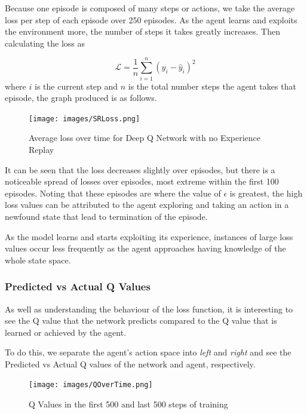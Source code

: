 \documentclass{article}
\begin{document}
Because one episode is composed of many steps or actions, we take the average loss per step of each episode over 250 episodes. As the agent learns and exploits the environment more, the number of steps it takes greatly increases. Then calculating the loss as 

\begin{equation}
    \mathcal{L} = \frac{1}{n} \sum_{i=1}^{n} (y_i - \hat{y}_i)^2
\end{equation}
where $i$ is the current step and $n$ is the total number steps the agent takes that episode, the graph produced is as follows.

\begin{figure}[H]
    \centering
    \texttt{[image: images/SRLoss.png]}
    \caption{Average loss over time for Deep Q Network with no Experience Replay}
    \label{fig:loss_sr}
\end{figure}

It can be seen that the loss decreases slightly over episodes, but there is a noticeable spread of losses over episodes, most extreme within the first 100 episodes. Noting that these episodes are where the value of $\epsilon$ is greatest, the high loss values can be attributed to the agent exploring and taking an action in a newfound state that lead to termination of the episode. 

As the model learns and starts exploiting its experience, instances of large loss values occur less frequently as the agent approaches having knowledge of the whole state space.

\subsubsection{Predicted vs Actual Q Values}

As well as understanding the behaviour of the loss function, it is interesting to see the Q value that the network predicts compared to the Q value that is learned or achieved by the agent.

To do this, we separate the agent's action space into \textit{left} and \textit{right} and see the Predicted vs Actual Q values of the network and agent, respectively.

\begin{figure}[H]
    \centering
    \texttt{[image: images/QOverTime.png]}
    \caption{Q Values in the first 500 and last 500 steps of training}
    \label{fig:SR_q_over_time}
\end{figure}
\end{document}
